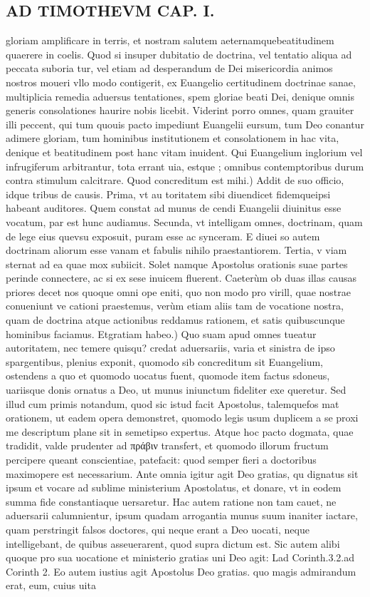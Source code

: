 \documentclass{article}
\begin{document}
\begin{pages}
\section*{AD TIMOTHEVM CAP. I. }
\marginpar{[ p.30 ]}\pstart gloriam amplificare in terris, et nostram salutem aeternamquebeatitudinem quaerere in coelis. Quod si insuper dubitatio de doctrina, vel tentatio aliqua ad peccata suboria tur, vel etiam ad desperandum de Dei misericordia animos nostros moueri vllo modo contigerit, ex Euangelio certitudinem doctrinae sanae, multiplicia remedia aduersus tentationes, spem gloriae beati Dei, denique  omnis generis consolationes haurire nobis licebit. Viderint porro omnes, quam grauiter illi peccent, qui tum quouis pacto impediunt Euangelii eursum, tum Deo conantur adimere gloriam, tum hominibus institutionem et consolationem in hac vita, denique  et beatitudinem post hanc vitam inuident. Qui Euangelium inglorium vel infrugiferum arbitrantur, tota errant uia, estque ; omnibus contemptoribus durum contra stimulum calcitrare.  \pend\pstart Quod concreditum est mihi.) Addit de suo officio, idque  tribus de causis. Prima, vt au toritatem sibi diuendicet fidemqueipsi habeant auditores. Quem constat ad munus de cendi Euangelii diuinitus esse vocatum, par est hunc audiamus. Secunda, vt intelligam omnes, doctrinam, quam de lege eius quevsu exposuit, puram esse ac synceram. E diuei so autem doctrinam aliorum esse vanam et fabulis nihilo praestantiorem. Tertia, v viam sternat ad ea quae mox subiicit. Solet namque  Apostolus orationis suae partes perinde connectere, ac si ex sese inuicem fluerent. Caeterùm ob duas illas causas priores decet nos quoque  omni ope eniti, quo non modo pro virill, quae nostrae conueniunt ve cationi praestemus, verùm etiam aliis tam de vocatione nostra, quam de doctrina atque  actionibus reddamus rationem, et satis quibuscunque  hominibus faciamus.  \pend\pstart Etgratiam habeo.) Quo suam apud omnes tueatur autoritatem, nec temere quisqu? credat aduersariis, varia et sinistra de ipso spargentibus, plenius exponit, quomodo sib concreditum sit Euangelium, ostendens a quo et quomodo uocatus fuent, quomode item factus sdoneus, uariisque  donis ornatus a Deo, ut munus iniunctum fideliter exe queretur. Sed illud cum primis notandum, quod sic istud facit Apostolus, talemquefos mat orationem, ut eadem opera demonstret, quomodo legis usum duplicem a se proxi me descriptum plane sit in semetipso expertus. Atque  hoc pacto dogmata, quae tradidit, valde prudenter ad πράβιν transfert, et quomodo illorum fructum percipere queant conscientiae, patefacit: quod semper fieri a doctoribus maximopere est necessarium. Ante omnia igitur agit Deo gratias, qu dignatus sit ipsum et vocare ad sublime ministerium Apostolatus, et donare, vt in eodem summa fide constantiaque  uersaretur. Hac autem ratione non tam cauet, ne aduersarii calumnientur, ipsum quadam arrogantia munus suum inaniter iactare, quam perstringit falsos doctores, qui neque  erant a Deo uocati, neque  intelligebant, de quibus asseuerarent, quod supra dictum est. Sic autem alibi quoque pro sua uocatione et ministerio gratias uni Deo agit: Lad Corinth.3.2.ad Corinth 2. Eo autem iustius agit Apostolus Deo gratias. quo magis admirandum erat, eum, cuius uita 
\end{pages}
\end{document}
